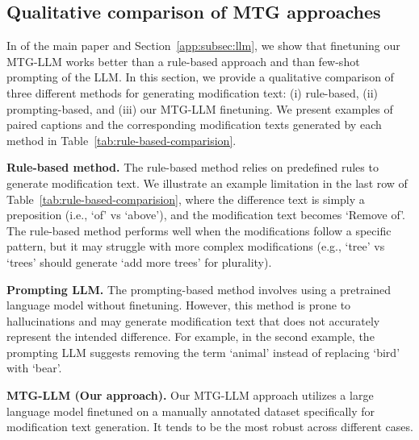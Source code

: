 \subsection{Qualitative comparison of MTG approaches}
\label{app:subsec:qualitative_mtg}
In 
\if{} \fi
of the main paper and Section~\ref{app:subsec:llm}, we show that finetuning our MTG-LLM works better
than a rule-based approach and than few-shot prompting of the LLM.
In this section, we provide a qualitative comparison of three different methods 
for generating modification text: (i) rule-based, (ii) prompting-based, and (iii) our MTG-LLM finetuning. 
We present examples of paired captions and the corresponding modification texts generated by each method in Table~\ref{tab:rule-based-comparision}.

\textbf{Rule-based method.} 
The rule-based method relies on predefined rules to generate modification text. 
We illustrate an example limitation in the last row of Table~\ref{tab:rule-based-comparision},
where the difference text is simply a preposition (i.e., `of' vs `above'), and the modification
text becomes `Remove of'.
The rule-based method performs well when the modifications follow a specific pattern, 
but it may struggle with more complex modifications (e.g., `tree' vs `trees' should generate `add more trees' for plurality).

\textbf{Prompting LLM.} 
The prompting-based method involves using a pretrained language model without finetuning.
However, this method is prone to hallucinations and may generate modification 
text that does not accurately represent the intended difference. 
For example, in the second example, 
the prompting LLM suggests removing the term `animal' instead of replacing `bird' with `bear'.

\textbf{MTG-LLM (Our approach).} 
Our MTG-LLM approach utilizes a large language model finetuned on a manually annotated dataset 
specifically for modification text generation. 
It tends to be the most robust across different cases.

